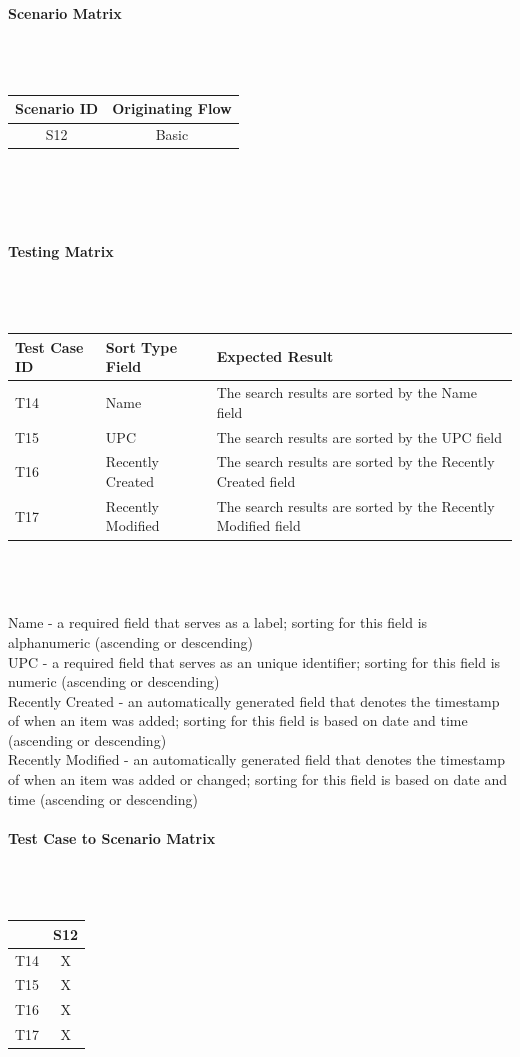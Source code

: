 \documentclass{article}
\begin{document}
\paragraph{Scenario Matrix}~\\ \\
\begin{tabular}{ c  c }
\hline
Scenario ID & Originating Flow\\
\hline
\hline
S12 & Basic\\
\hline
\end{tabular}\\
~\\
~\\
\paragraph{Testing Matrix}~\\ \\
\begin{tabular}{ p{0.8in}  p{1.1in}  p{3.6in} }
\hline
Test Case ID & Sort Type Field & Expected Result\\
\hline
\hline
T14 & Name & The search results are sorted by the Name field\\
\hline
T15 & UPC & The search results are sorted by the UPC field\\
\hline
T16 & Recently Created & The search results are sorted by the Recently Created field\\
\hline
T17 & Recently Modified & The search results are sorted by the Recently Modified field\\
\hline
\end{tabular}\\
~\\
~\\
Name - a required field that serves as a label; sorting for this field is alphanumeric (ascending or descending)\\
UPC - a required field that serves as an unique identifier; sorting for this field is numeric (ascending or descending)\\
Recently Created - an automatically generated field that denotes the timestamp of when an item was added; sorting for this field is based on date and time (ascending or descending)\\
Recently Modified - an automatically generated field that denotes the timestamp of when an item was added or changed; sorting for this field is based on date and time (ascending or descending)
\paragraph{Test Case to Scenario Matrix}~\\ \\
\begin{tabular}{ | c || c | }
\hline
    & S12 \\
\hline
\hline
T14 &  X  \\
\hline
T15 &  X  \\
\hline
T16 &  X  \\
\hline
T17 &  X  \\
\hline
\end{tabular}
\end{document}
